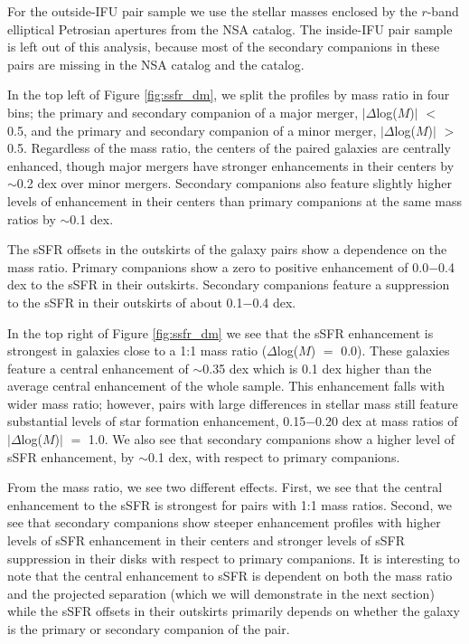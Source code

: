 \documentclass[iop,revtex4,twocolumn,apj,numberedappendix,appendixfloats]{emulateapj}
\begin{document}
For the outside-IFU pair sample we use the stellar masses enclosed by the $r$-band elliptical Petrosian apertures from the NSA catalog. The inside-IFU pair sample is left out of this analysis, because most of the secondary companions in these pairs are missing in the NSA catalog and the \citet{Simard:2011} catalog.

In the top left of Figure \ref{fig:ssfr_dm}, we split the profiles by mass ratio in four bins; the primary and secondary companion of a major merger, $|\Delta$log($M$)$|$ $<$ 0.5, and the primary and secondary companion of a minor merger, $|\Delta$log($M$)$|$ $>$ 0.5. Regardless of the mass ratio, the centers of the paired galaxies are centrally enhanced, though major mergers have stronger enhancements in their centers by $\sim$0.2 dex over minor mergers. Secondary companions also feature slightly higher levels of enhancement in their centers than primary companions at the same mass ratios by $\sim$0.1 dex. 

The sSFR offsets in the outskirts of the galaxy pairs show a dependence on the mass ratio. Primary companions show a zero to positive enhancement of 0.0$-$0.4 dex to the sSFR in their outskirts. Secondary companions feature a suppression to the sSFR in their outskirts of about 0.1$-$0.4 dex. 

In the top right of Figure \ref{fig:ssfr_dm} we see that the sSFR enhancement is strongest in galaxies close to a 1:1 mass ratio ($\Delta$log($M$) $=$ 0.0). These galaxies feature a central enhancement of $\sim$0.35 dex which is 0.1 dex higher than the average central enhancement of the whole sample. This enhancement falls with wider mass ratio; however, pairs with large differences in stellar mass still feature substantial levels of star formation enhancement, 0.15$-$0.20 dex at mass ratios of $|\Delta$log($M$)$|$ $=$ 1.0. We also see that secondary companions show a higher level of sSFR enhancement, by $\sim$0.1 dex, with respect to primary companions. 

From the mass ratio, we see two different effects. First, we see that the central enhancement to the sSFR is strongest for pairs with 1:1 mass ratios. Second, we see that secondary companions show steeper enhancement profiles with higher levels of sSFR enhancement in their centers and stronger levels of sSFR suppression in their disks with respect to primary companions. It is interesting to note that the central enhancement to sSFR is dependent on both the mass ratio and the projected separation (which we will demonstrate in the next section) while the sSFR offsets in their outskirts primarily depends on whether the galaxy is the primary or secondary companion of the pair.
\end{document}
